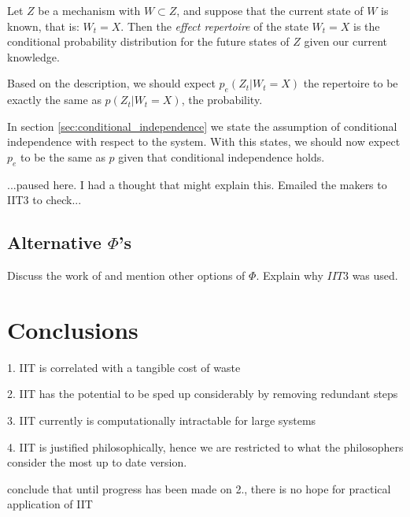 \begin{definition}
Let $Z$ be a mechanism with $W\subset Z$, and suppose that the current state of $W$ is known, that is: $W_t = X$. Then the \textit{effect repertoire} of the state $W_t = X$ is the conditional probability distribution for the future states of $Z$ given our current knowledge.
\end{definition}

Based on the description, we should expect $p_e(Z_t|W_t = X)$ the repertoire to be exactly the same as $p(Z_t|W_t = X)$, the probability. 

In section \ref{sec:conditional_independence} we state the assumption of conditional independence with respect to the system. With this states, we should now expect $p_e$ to be the same as $p$ given that conditional independence holds.

...paused here. I had a thought that might explain this. Emailed the makers to IIT3 to check...


\subsection{Alternative $\Phi$'s}
Discuss the work of \cite{tegmark2016improved} and mention other options of $\Phi$. Explain why $IIT3$ was used.

\section{Conclusions}

1. IIT is correlated with a tangible cost of waste

2. IIT has the potential to be sped up considerably by removing redundant steps

3. IIT currently is computationally intractable for large systems

4. IIT is justified philosophically, hence we are restricted to what the philosophers consider the most up to date version.

conclude that until progress has been made on 2., there is no hope for practical application of IIT
